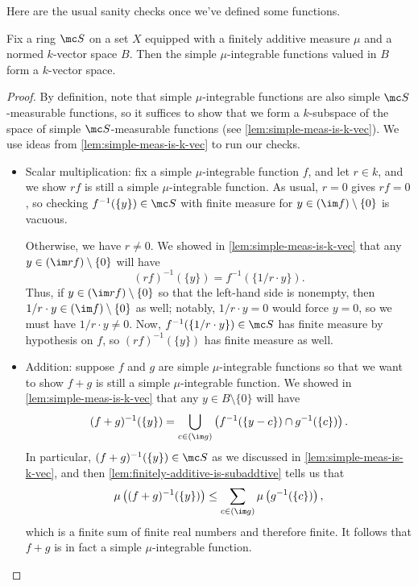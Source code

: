 \documentclass[../notes.tex]{subfiles}
\begin{document}
Here are the usual sanity checks once we've defined some functions.
\begin{lemma} \label{lem:simple-int-is-k-vec}
	Fix a ring $\mc S$ on a set $X$ equipped with a finitely additive measure $\mu$ and a normed $k$-vector space $B$. Then the simple $\mu$-integrable functions valued in $B$ form a $k$-vector space.
\end{lemma}
\begin{proof}
	By definition, note that simple $\mu$-integrable functions are also simple $\mc S$-measurable functions, so it suffices to show that we form a $k$-subspace of the space of simple $\mc S$-measurable functions (see \autoref{lem:simple-meas-is-k-vec}). We use ideas from \autoref{lem:simple-meas-is-k-vec} to run our checks.
	\begin{itemize}
		\item Scalar multiplication: fix a simple $\mu$-integrable function $f$, and let $r\in k$, and we show $rf$ is still a simple $\mu$-integrable function. As usual, $r=0$ gives $rf=0$, so checking $f^{-1}(\{y\})\in\mc S$ with finite measure for $y\in(\im f)\setminus\{0\}$ is vacuous.

		Otherwise, we have $r\ne0$. We showed in \autoref{lem:simple-meas-is-k-vec} that any $y\in(\im rf)\setminus\{0\}$ will have
		\[(rf)^{-1}(\{y\})=f^{-1}(\{1/r\cdot y\}).\]
		Thus, if $y\in(\im rf)\setminus\{0\}$ so that the left-hand side is nonempty, then $1/r\cdot y\in(\im f)\setminus\{0\}$ as well; notably, $1/r\cdot y=0$ would force $y=0$, so we must have $1/r\cdot y\ne0$. Now, $f^{-1}(\{1/r\cdot y\})\in\mc S$ has finite measure by hypothesis on $f$, so $(rf)^{-1}(\{y\})$ has finite measure as well.

		\item Addition: suppose $f$ and $g$ are simple $\mu$-integrable functions so that we want to show $f+g$ is still a simple $\mu$-integrable function. We showed in \autoref{lem:simple-meas-is-k-vec} that any $y\in B\setminus\{0\}$ will have
		\[(f+g)^{-1}(\{y\})=\bigcup_{c\in(\im g)}\left(f^{-1}(\{y-c\})\cap g^{-1}(\{c\})\right).\]
		In particular, $(f+g)^{-1}(\{y\})\in\mc S$ as we discussed in \autoref{lem:simple-meas-is-k-vec}, and then \autoref{lem:finitely-additive-is-subaddtive} tells us that
		\[\mu\left((f+g)^{-1}(\{y\})\right)\le\sum_{c\in(\im g)}\mu\left(g^{-1}(\{c\})\right),\]
		which is a finite sum of finite real numbers and therefore finite. It follows that $f+g$ is in fact a simple $\mu$-integrable function.
		\qedhere
	\end{itemize}
\end{proof}
\end{document}
